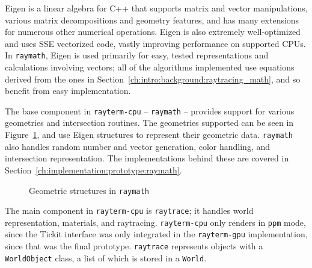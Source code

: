 Eigen \cite{eigenweb} is a linear algebra for C++ that supports matrix and vector manipulations, various matrix decompositions and geometry features, and has many extensions for numerous other numerical operations.
Eigen is also extremely well-optimized and uses SSE vectorized code, vastly improving performance on supported CPUs.
In \texttt{raymath}, Eigen is used primarily for easy, tested representations and calculations involving vectors; all of the algorithms implemented use equations derived from the ones in Section~\ref{ch:intro:background:raytracing_math}, and so benefit from easy implementation.

The base component in \texttt{rayterm-cpu} -- \texttt{raymath} -- provides support for various geometries and intersection routines.
The geometries supported can be seen in Figure~\ref{fig:rayterm-cpu_raymath_geometry}, and use Eigen structures to represent their geometric data.
\texttt{raymath} also handles random number and vector generation, color handling, and intersection representation.
The implementations behind these are covered in Section~\ref{ch:implementation:prototype:raymath}.

\vspace{0.3em}
\begin{figure}[htb]
  \centering
  \caption{Geometric structures in \texttt{raymath}}
\label{fig:rayterm-cpu_raymath_geometry}
\end{figure}

The main component in \texttt{rayterm-cpu} is \texttt{raytrace}; it handles world representation, materials, and raytracing.
\texttt{rayterm-cpu} only renders in \texttt{ppm} mode, since the Tickit interface was only integrated in the \texttt{rayterm-gpu} implementation, since that was the final prototype.
\texttt{raytrace} represents objects with a \texttt{WorldObject} class, a list of which is stored in a \texttt{World}.

